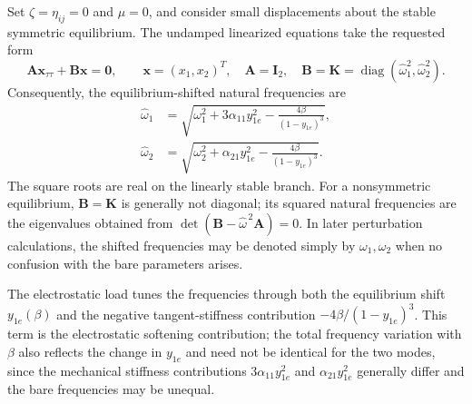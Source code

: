 \documentclass[11pt]{article}
\begin{document}
Set $\zeta=\eta_{ij}=0$ and $\mu=0$, and consider small displacements about the stable symmetric equilibrium. The undamped linearized equations take the requested form
\begin{equation}\label{eq:undamped-eigenproblem}
\mathbf{A}\mathbf{x}_{\tau\tau}+\mathbf{B}\mathbf{x}=\mathbf{0},\qquad
\mathbf{x}=(x_1,x_2)^T,\quad \mathbf{A}=\mathbf{I}_2,\quad
\mathbf{B}=\mathbf{K}=\operatorname{diag}(\hat{\omega}_1^2,\hat{\omega}_2^2).
\end{equation}
Consequently, the equilibrium-shifted natural frequencies are
\begin{align}
\hat{\omega}_1&=\sqrt{\omega_1^2+3\alpha_{11}y_{1e}^2-\frac{4\beta}{(1-y_{1e})^3}},\label{eq:frequency-one}\\
\hat{\omega}_2&=\sqrt{\omega_2^2+\alpha_{21}y_{1e}^2-\frac{4\beta}{(1-y_{1e})^3}}.\label{eq:frequency-two}
\end{align}
The square roots are real on the linearly stable branch. For a nonsymmetric equilibrium, $\mathbf{B}=\mathbf{K}$ is generally not diagonal; its squared natural frequencies are the eigenvalues obtained from $\det(\mathbf{B}-\hat{\omega}^{\,2}\mathbf{A})=0$. In later perturbation calculations, the shifted frequencies may be denoted simply by $\omega_1,\omega_2$ when no confusion with the bare parameters arises.

The electrostatic load tunes the frequencies through both the equilibrium shift $y_{1e}(\beta)$ and the negative tangent-stiffness contribution $-4\beta/(1-y_{1e})^3$. This term is the electrostatic softening contribution; the total frequency variation with $\beta$ also reflects the change in $y_{1e}$ and need not be identical for the two modes, since the mechanical stiffness contributions $3\alpha_{11}y_{1e}^2$ and $\alpha_{21}y_{1e}^2$ generally differ and the bare frequencies may be unequal.
\end{document}
